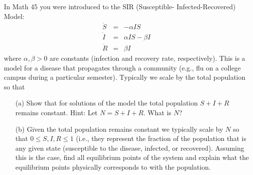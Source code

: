 \documentclass[11pt,letterpaper,boxed]{hmcpset}
\begin{document}
\begin{problem}[7.] In Math 45 you were introduced to the SIR (Susceptible- Infected-Recovered) Model:
\begin{eqnarray*}
\dot{S} & = & -\alpha I S \\
\dot{I} & = &  \alpha I S - \beta I  \\
\dot{R} & = & \beta I
\end{eqnarray*}
where $\alpha,\beta  > 0$ are constants (infection and recovery rate, respectively).   
This is a model for a disease that propagates through a community (e.g., flu on a college campus during a particular semester). Typically we scale by the total population so that
 \begin{enumerate}
\item[(a)] Show that for solutions of the model the total population $S+I+R$ remains constant. Hint: Let $N=S+I+R$. What is $\dot{N}$?
\item[(b)] Given the total population remains constant we typically scale by $N$ so that $0 \leq S,I,R \leq 1$ (i.e., they represent the fraction of the population that is any given state (susceptible to the disease, infected, or recovered). Assuming this is the case, find all equilibrium points of the system and explain what the
equilibrium points physically corresponds to with the population.
\end{enumerate} 
\end{problem}

\begin{solution}
\vfill
\end{solution}
\newpage
\end{document}

